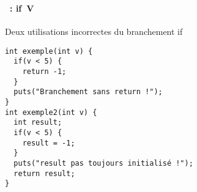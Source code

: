 \begin{frame}[containsverbatim]
  \frametitle{\secname}
  \framesubtitle{\subsecname~: if~V}

  {\small\begin{exampleblock}{Deux utilisations incorrectes du branchement if}
    \begin{verbatim}
int exemple(int v) {
  if(v < 5) {
    return -1;
  }
  puts("Branchement sans return !");
}     
int exemple2(int v) {
  int result;
  if(v < 5) {
    result = -1;
  }
  puts("result pas toujours initialisé !");
  return result;
}\end{verbatim}
  \end{exampleblock}}
\end{frame}

